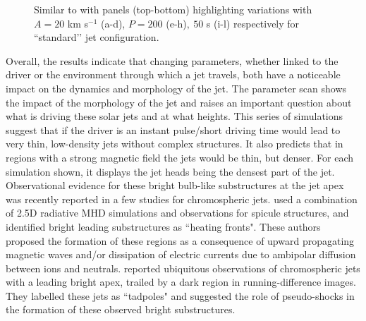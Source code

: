 \begin{figure}
\captionsetup[subfigure]{labelformat=empty}
\centering
{}
\caption{Similar to  with panels (top-bottom) highlighting variations with $A = 20$ km s$^{-1}$ (a-d), $P = 200$ (e-h)$,~50$ s (i-l) respectively for ``standard’’ jet configuration.}
\label{paramter_scan_two}
\end{figure}
Overall, the results indicate that changing parameters, whether linked to the driver or the environment through which a jet travels, both have a noticeable impact on the dynamics and morphology of the jet. The parameter scan shows the impact of the morphology of the jet and raises an important question about what is driving these solar jets and at what heights. This series of simulations suggest that if the driver is an instant pulse/short driving time would lead to very thin, low-density jets without complex structures. It also predicts that in regions with a strong magnetic field the jets would be thin, but denser. For each simulation shown, it displays the jet heads being the densest part of the jet. Observational evidence for these bright bulb-like substructures at the jet apex was recently reported in a few studies \citep{depontieu2017, srivastava2018NatAs} for chromospheric jets. \citet{depontieu2017} used a combination of 2.5D radiative MHD simulations and observations for spicule structures, and identified bright leading substructures as ``heating fronts". These authors proposed the formation of these regions as a consequence of upward propagating magnetic waves and/or dissipation of electric currents due to ambipolar diffusion between ions and neutrals. \citet{srivastava2018NatAs} reported ubiquitous observations of chromospheric jets with a leading bright apex, trailed by a dark region in running-difference images. They labelled these jets as ``tadpoles" and suggested the role of pseudo-shocks in the formation of these observed bright substructures.

